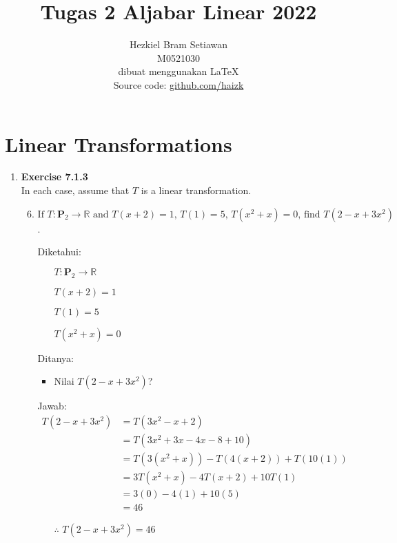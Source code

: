 \documentclass[12pt, a4paper]{scrartcl}
\begin{document}
\title{Tugas 2 Aljabar Linear 2022}
\author{Hezkiel Bram Setiawan\\M0521030\\dibuat menggunakan \LaTeX\\Source code: \href{https://github.com/haizk/Linear-Transformations-and-Orthogonality}{github.com/haizk}}
\date{}
\maketitle

\section*{Linear Transformations}
    \begin{enumerate}
        \item \textbf{Exercise 7.1.3}\\In each case, assume that $T$ is a linear transformation.
        \begin{enumerate}
            \setcounter{enumii}{5}
            \item $\mbox{If } T : \textbf{P}_2 \to \mathbb{R} \mbox{ and } T(x+2)=1 \mbox{, } T(1)=5 \mbox{, } T(x^2+x)=0 \mbox{, find } T(2-x+3x^2)$.

            Diketahui:
            \begin{itemize}
                \item[] $T : \textbf{P}_2 \to \mathbb{R}$\item[]$T(x+2)=1$\item[]$T(1)=5$\item[]$T(x^2+x)=0$
            \end{itemize}

            Ditanya:
            \begin{itemize}
                \item Nilai $T(2-x+3x^2)$?
            \end{itemize}

            Jawab:
            \begin{align*}
                T(2-x+3x^2) &= T(3x^2-x+2)\\
                &= T(3x^2+3x-4x-8+10)\\
                &= T(3(x^2+x))-T(4(x+2))+T(10(1))\\
                &= 3T(x^2+x)-4T(x+2)+10T(1)\\
                &= 3(0)-4(1)+10(5)\\
                &= 46
            \end{align*}
            \begin{itemize}
                \item[$\therefore$] $T(2-x+3x^2) = 46$
            \end{itemize}
        \end{enumerate}


\end{enumerate}
\end{document}
